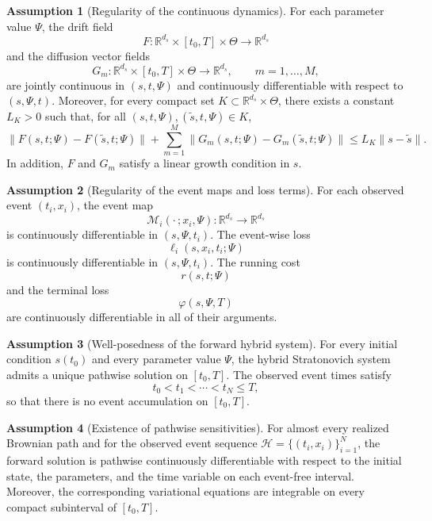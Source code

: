 \documentclass[11pt]{article}
\theoremstyle{definition}
\newtheorem{assumption}{Assumption}
\numberwithin{equation}{section}
\numberwithin{theorem}{section}
\numberwithin{proposition}{section}
\numberwithin{lemma}{section}
\numberwithin{corollary}{section}
\numberwithin{definition}{section}
\numberwithin{remark}{section}
\newcommand{\1}{\mathbbm{1}}
\begin{document}
\begin{assumption}[Regularity of the continuous dynamics]
\label{ass:regularity_dynamics}
For each parameter value $\Psi$, the drift field
\[
F:\mathbb{R}^{d_s}\times [t_0,T]\times \Theta \to \mathbb{R}^{d_s}
\]
and the diffusion vector fields
\[
G_m:\mathbb{R}^{d_s}\times [t_0,T]\times \Theta \to \mathbb{R}^{d_s},
\qquad m=1,\dots,M,
\]
are jointly continuous in $(s,t,\Psi)$ and continuously differentiable with respect to $(s,\Psi,t)$. Moreover, for every compact set $K\subset \mathbb{R}^{d_s}\times \Theta$, there exists a constant $L_K>0$ such that, for all $(s,t,\Psi),(\tilde s,t,\Psi)\in K$,
\[
\|F(s,t;\Psi)-F(\tilde s,t;\Psi)\|
+
\sum_{m=1}^M \|G_m(s,t;\Psi)-G_m(\tilde s,t;\Psi)\|
\le L_K \|s-\tilde s\|.
\]
In addition, $F$ and $G_m$ satisfy a linear growth condition in $s$.
\end{assumption}

\begin{assumption}[Regularity of the event maps and loss terms]
\label{ass:regularity_events_losses}
For each observed event $(t_i,x_i)$, the event map
\[
\mathcal M_i(\cdot\,;x_i,\Psi):\mathbb{R}^{d_s}\to\mathbb{R}^{d_s}
\]
is continuously differentiable in $(s,\Psi,t_i)$. The event-wise loss
\[
\ell_i(s,x_i,t_i;\Psi)
\]
is continuously differentiable in $(s,\Psi,t_i)$. The running cost
\[
r(s,t;\Psi)
\]
and the terminal loss
\[
\varphi(s,\Psi,T)
\]
are continuously differentiable in all of their arguments.
\end{assumption}

\begin{assumption}[Well-posedness of the forward hybrid system]
\label{ass:wellposedness}
For every initial condition $s(t_0)$ and every parameter value $\Psi$, the hybrid Stratonovich system admits a unique pathwise solution on $[t_0,T]$. The observed event times satisfy
\[
t_0 < t_1 < \cdots < t_N \le T,
\]
so that there is no event accumulation on $[t_0,T]$.
\end{assumption}

\begin{assumption}[Existence of pathwise sensitivities]
\label{ass:sensitivity}
For almost every realized Brownian path and for the observed event sequence $\mathcal H=\{(t_i,x_i)\}_{i=1}^N$, the forward solution is pathwise continuously differentiable with respect to the initial state, the parameters, and the time variable on each event-free interval. Moreover, the corresponding variational equations are integrable on every compact subinterval of $[t_0,T]$.
\end{assumption}
\end{document}
